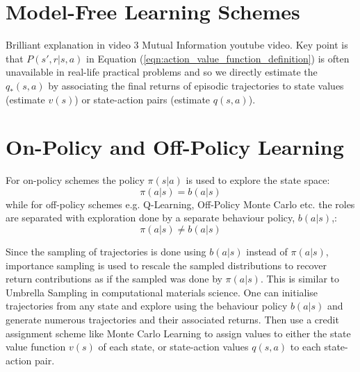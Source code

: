 \documentclass[a4paper,11pt]{article}
\begin{document}
\section{Model-Free Learning Schemes}

Brilliant explanation in video 3 Mutual Information youtube video.  Key point is that $P(s',r|s,a)$ in Equation (\ref{eqn:action_value_function_definition}) is often unavailable in real-life practical problems and so we directly estimate the $q_*(s,a)$ by associating the final returns of episodic trajectories to state values (estimate $v(s)$) or state-action pairs (estimate $q(s,a)$).

\section{On-Policy and Off-Policy Learning}

For on-policy schemes the policy $\pi(s|a)$ is used to explore the state space:
\begin{equation} \label{eqn:on-policy-definition}
    \pi(a|s) = b(a|s)
\end{equation}
while for off-policy schemes e.g. Q-Learning, Off-Policy Monte Carlo etc. the roles are separated with exploration done by a separate behaviour policy, $b(a|s)$,:
\begin{equation} \label{eqn:off-policy-definition}
    \pi(a|s) \neq b(a|s)
\end{equation}

Since the sampling of trajectories is done using $b(a|s)$ instead of $\pi(a|s)$, importance sampling is used to rescale the sampled distributions to recover return contributions as if the sampled was done by $\pi(a|s)$.  This is similar to Umbrella Sampling in computational materials science.  One can initialise trajectories from any state and explore using the behaviour policy $b(a|s)$ and generate numerous trajectories and their associated returns.  Then use a credit assignment scheme like Monte Carlo Learning to assign values to either the state value function $v(s)$ of each state, or state-action values $q(s,a)$ to each state-action pair.
\end{document}
